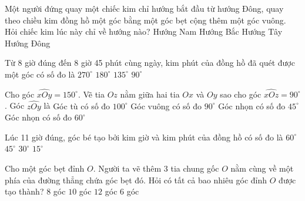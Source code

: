 \begin{ex} %
Một người đứng quay một chiếc kim chỉ hướng bắt đầu từ hướng Đông, quay theo chiều kim đồng hồ một góc bằng một góc bẹt cộng thêm một góc vuông. Hỏi chiếc kim lúc này chỉ về hướng nào?
\choice
{Hướng Nam}
{\True Hướng Bắc}
{Hướng Tây}
{Hướng Đông}
\end{ex}

\begin{ex} %
Từ 8 giờ đúng đến 8 giờ 45 phút cùng ngày, kim phút của đồng hồ đã quét được một góc có số đo là
\choice
{\True $270^\circ$}
{$180^\circ$}
{$135^\circ$}
{$90^\circ$}
\end{ex}

\begin{ex} %
Cho góc $\widehat{xOy} = 150^\circ$. Vẽ tia $Oz$ nằm giữa hai tia $Ox$ và $Oy$ sao cho góc $\widehat{xOz} = 90^\circ$. Góc $\widehat{zOy}$ là
\choice
{Góc tù có số đo $100^\circ$}
{Góc vuông có số đo $90^\circ$}
{Góc nhọn có số đo $45^\circ$}
{\True Góc nhọn có số đo $60^\circ$}
\end{ex}

\begin{ex} %
Lúc 11 giờ đúng, góc bé tạo bởi kim giờ và kim phút của đồng hồ có số đo là
\choice
{$60^\circ$}
{$45^\circ$}
{\True $30^\circ$}
{$15^\circ$}
\end{ex}

\begin{ex} %
Cho một góc bẹt đỉnh $O$. Người ta vẽ thêm $3$ tia chung gốc $O$ nằm cùng về một phía của đường thẳng chứa góc bẹt đó. Hỏi có tất cả bao nhiêu góc đỉnh $O$ được tạo thành?
\choice
{$8$ góc}
{\True $10$ góc}
{$12$ góc}
{$6$ góc}
\end{ex}

